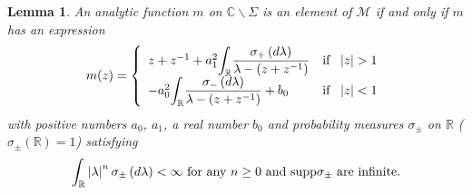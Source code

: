 \documentclass[a4paper]{article}%
\newtheorem{lemma}{Lemma}
\begin{document}
\begin{lemma}
\label{l3-1}An analytic function $m$ on $\mathbb{C}\backslash\Sigma$ is an
element of $\mathcal{M}$ if and only if $m$ has an expression%
\[
m(z)=\left\{
\begin{array}
[c]{c}%
z+z^{-1}+a_{1}^{2}%
{\displaystyle\int_{\mathbb{R}}}
\dfrac{\sigma_{+}\left(  d\lambda\right)  }{\lambda-\left(  z+z^{-1}\right)
}\text{ \ \ if \ }\left\vert z\right\vert >1\\
-a_{0}^{2}%
{\displaystyle\int_{\mathbb{R}}}
\dfrac{\sigma_{-}\left(  d\lambda\right)  }{\lambda-\left(  z+z^{-1}\right)
}+b_{0}\text{ \ \ \ \ \ \ \ if \ }\left\vert z\right\vert <1
\end{array}
\right.
\]
with positive numbers $a_{0}$, $a_{1}$, a real number $b_{0}$ and probability
measures $\sigma_{\pm}$ on $\mathbb{R}$ ($\sigma_{\pm}\left(  \mathbb{R}%
\right)  =1$) satisfying%
\begin{equation}
\int_{\mathbb{R}}\left\vert \lambda\right\vert ^{n}\sigma_{\pm}\left(
d\lambda\right)  <\infty\text{\ for any }n\geq0\text{ and \textrm{supp}}%
\sigma_{\pm}\text{ are infinite.} \label{3-2}%
\end{equation}

\end{lemma}
\end{document}
